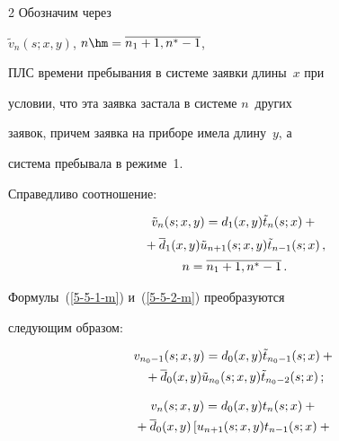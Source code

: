 \begin{multicols}{2}
Обозначим через


$\tilde{v}_{n}(s;x,y)$, $n\hm=\overline{n_1+1,n^*-1}$,


ПЛС времени пребывания в сис\-те\-ме заявки длины~$x$ при


условии, что эта заявка застала в системе $n$~других


заявок, причем заявка на приборе имела длину~$y$, а


система пребывала в режиме~1.


Справедливо соотношение:


\begin{multline*}


\tilde{v}_{n}(s;x,y) = d_1(x,y) \tilde{t}_{n}(s;x) +{}\\[2pt]


{}+\d_1(x,y) \tilde{u}_{n+1}(s;x,y) \tilde{t}_{n-1}(s;x)\,,\\[2pt]


  n=\overline{n_1+1,n^*-1}\,.


\end{multline*}




Формулы~(\ref{5-5-1-m}) и~(\ref{5-5-2-m}) преобразуются


следующим образом:


\begin{multline*}




v_{n_0-1}(s;x,y)= d_0(x,y) \tilde{t}_{n_0-1}(s;x) +{}\\


{}+


\d_0(x,y) \tilde{u}_{n_0}(s;x,y) \tilde{t}_{n_0-2}(s;x) \,;


\end{multline*}




\vspace*{-12pt}





\noindent


\begin{multline*}




v_{n}(s;x,y) = d_0(x,y) t_{n}(s;x) +{}


\\


{}+


\d_0(x,y) \left[ u_{n+1}(s;x,y) t_{n-1}(s;x) +{}\right.\\



\end{multline*}
\end{multicols}
